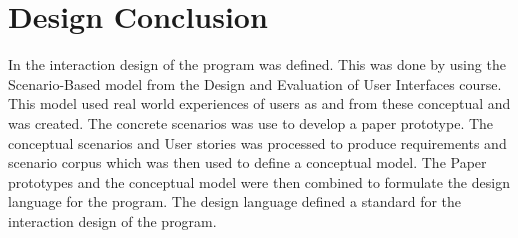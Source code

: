 \chapter{Design Conclusion}
In  the interaction design of the program was defined. This was done by using the Scenario-Based model from the Design and Evaluation of User Interfaces course. This model used real world experiences of users as  and from these conceptual and  was created. The concrete scenarios was use to develop a paper prototype. The conceptual scenarios and User stories was processed to produce requirements and scenario corpus which was then used to define a conceptual model. The Paper prototypes and the conceptual model were then combined to formulate the design language for the program. The design language defined a standard for the interaction design of the program.  